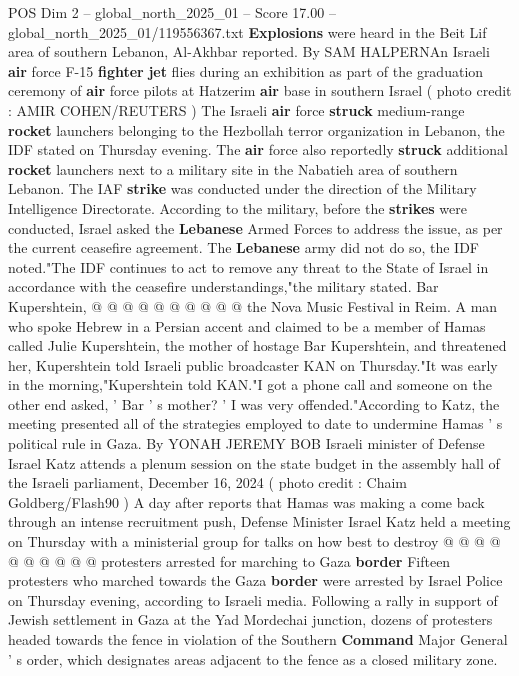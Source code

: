 \begin{textsample}{POS Dim 2 – global\_north\_2025\_01 – Score 17.00 – global\_north\_2025\_01/119556367.txt}  \label{ex:f2_pos_400}
\textbf{Explosions} were heard in the Beit Lif area of southern Lebanon, Al-Akhbar reported.
By SAM HALPERNAn Israeli \textbf{air} force F-15 \textbf{fighter} \textbf{jet} flies during an exhibition as part of the graduation ceremony of \textbf{air} force pilots at Hatzerim \textbf{air} base in southern Israel ( photo credit : AMIR COHEN/REUTERS ) The Israeli \textbf{air} force \textbf{struck} medium-range \textbf{rocket} launchers belonging to the Hezbollah terror organization in Lebanon, the IDF stated on Thursday evening.
The \textbf{air} force also reportedly \textbf{struck} additional \textbf{rocket} launchers next to a military site in the Nabatieh area of southern Lebanon.
The IAF \textbf{strike} was conducted under the direction of the Military Intelligence Directorate.
According to the military, before the \textbf{strikes} were conducted, Israel asked the \textbf{Lebanese} Armed Forces to address the issue, as per the current ceasefire agreement.
The \textbf{Lebanese} army did not do so, the IDF noted."The IDF continues to act to remove any threat to the State of Israel in accordance with the ceasefire understandings,"the military stated.
Bar Kupershtein, @ @ @ @ @ @ @ @ @ @ the Nova Music Festival in Reim.
A man who spoke Hebrew in a Persian accent and claimed to be a member of Hamas called Julie Kupershtein, the mother of hostage Bar Kupershtein, and threatened her, Kupershtein told Israeli public broadcaster KAN on Thursday."It was early in the morning,"Kupershtein told KAN."I got a phone call and someone on the other end asked, ' Bar ' s mother? ' I was very offended."According to Katz, the meeting presented all of the strategies employed to date to undermine Hamas ' s political rule in Gaza.
By YONAH JEREMY BOB Israeli minister of Defense Israel Katz attends a plenum session on the state budget in the assembly hall of the Israeli parliament, December 16, 2024 ( photo credit : Chaim Goldberg/Flash90 ) A day after reports that Hamas was making a come back through an intense recruitment push, Defense Minister Israel Katz held a meeting on Thursday with a ministerial group for talks on how best to destroy @ @ @ @ @ @ @ @ @ @ protesters arrested for marching to Gaza \textbf{border} Fifteen protesters who marched towards the Gaza \textbf{border} were arrested by Israel Police on Thursday evening, according to Israeli media.
Following a rally in support of Jewish settlement in Gaza at the Yad Mordechai junction, dozens of protesters headed towards the fence in violation of the Southern \textbf{Command} Major General ' s order, which designates areas adjacent to the fence as a closed military zone.

\end{textsample}
